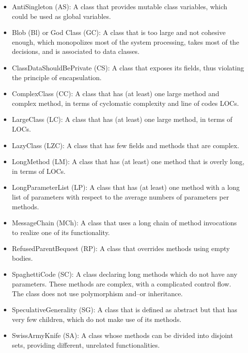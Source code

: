 \begin{itemize}
\item AntiSingleton (AS): A class that provides mutable class variables, which could be used as global variables.

\item Blob (Bl) or God Class (GC): A class that is too large and not cohesive enough, which monopolizes most of the system processing, takes most of the decisions, and is associated to data classes.

\item ClassDataShouldBePrivate (CS): A class that exposes its fields, thus violating the principle of encapsulation.

\item ComplexClass (CC): A class that has (at least) one large method and complex method, in terms of cyclomatic complexity and line of codes LOCs.

\item LargeClass (LC): A class that has (at least) one large method, in terms of LOCs.

\item LazyClass (LZC): A class that has few fields and methods that are complex.

\item LongMethod (LM): A class that has (at least) one method that is overly long, in terms of LOCs.

\item LongParameterList (LP): A class that has (at least) one method with a long list of parameters with respect to the average numbers of parameters per methods.

\item MessageChain (MCh): A class that uses a long chain of method invocations to realize one of its functionality.

\item RefusedParentBequest (RP): A class that overrides methods using empty bodies.

\item SpaghettiCode (SC): A class declaring long methods which do not have any parameters. These methods are complex, with a complicated control flow. The class does not use polymorphism and--or inheritance.

\item SpeculativeGenerality (SG): A class that is defined as abstract but that has very few children, which do not make use of its methods.

\item SwissArmyKnife (SA): A class whose methods can be divided into disjoint sets, providing different, unrelated functionalities.
\end{itemize}


